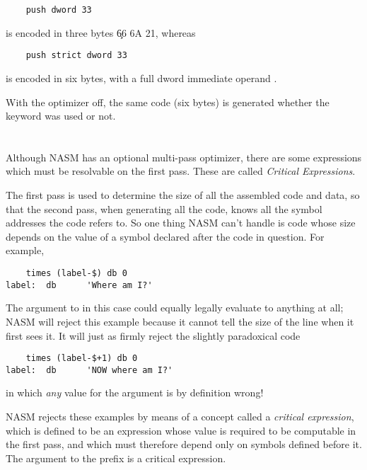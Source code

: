 \begin{lstlisting}
	push dword 33
\end{lstlisting}

is encoded in three bytes \c{66 6A 21}, whereas

\begin{lstlisting}
	push strict dword 33
\end{lstlisting}

is encoded in six bytes, with a full dword immediate operand
.

With the optimizer off, the same code (six bytes) is generated whether
the  keyword was used or not.


\section{}
\label{sec:crit}

Although NASM has an optional multi-pass optimizer, there are some
expressions which must be resolvable on the first pass. These are
called \emph{Critical Expressions}.

The first pass is used to determine the size of all the assembled
code and data, so that the second pass, when generating all the
code, knows all the symbol addresses the code refers to. So one
thing NASM can't handle is code whose size depends on the value
of a symbol declared after the code in question. For example,

\begin{lstlisting}
	times (label-$) db 0
label:	db      'Where am I?'
\end{lstlisting}

The argument to  in this case could equally legally
evaluate to anything at all; NASM will reject this example because
it cannot tell the size of the  line when it first sees it.
It will just as firmly reject the slightly paradoxical
code

\begin{lstlisting}
	times (label-$+1) db 0
label:  db      'NOW where am I?'
\end{lstlisting}

in which \emph{any} value for the  argument
is by definition wrong!

NASM rejects these examples by means of a concept called a
\emph{critical expression}, which is defined to be an
expression whose value is required to be computable in
the first pass, and which must therefore depend only
on symbols defined before it. The argument to the 
prefix is a critical expression.

